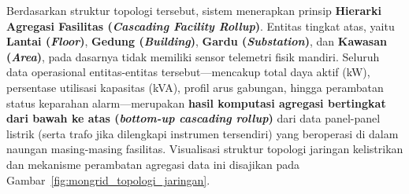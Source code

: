 Berdasarkan struktur topologi tersebut, sistem menerapkan prinsip \textbf{Hierarki Agregasi Fasilitas (\textit{Cascading Facility Rollup})}. Entitas tingkat atas, yaitu \textbf{Lantai (\textit{Floor})}, \textbf{Gedung (\textit{Building})}, \textbf{Gardu (\textit{Substation})}, dan \textbf{Kawasan (\textit{Area})}, pada dasarnya tidak memiliki sensor telemetri fisik mandiri. Seluruh data operasional entitas-entitas tersebut—mencakup total daya aktif (kW), persentase utilisasi kapasitas (kVA), profil arus gabungan, hingga perambatan status keparahan alarm—merupakan \textbf{hasil komputasi agregasi bertingkat dari bawah ke atas (\textit{bottom-up cascading rollup})} dari data panel-panel listrik (serta trafo jika dilengkapi instrumen tersendiri) yang beroperasi di dalam naungan masing-masing fasilitas. Visualisasi struktur topologi jaringan kelistrikan dan mekanisme perambatan agregasi data ini disajikan pada Gambar~\ref{fig:mongrid_topologi_jaringan}.

